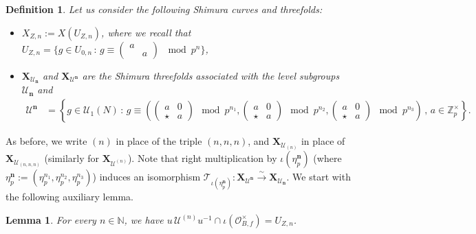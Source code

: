 \documentclass{amsart}
\numberwithin{equation}{section}
\newtheorem{lemma}[theorem]{Lemma}
\newtheorem{defn}[theorem]{Definition}
\newcommand{\NN}{\mathbb{N}}
\newcommand{\Zp}{\mathbb{Z}_p}
\newcommand{\cO}{\mathcal{O}}
\begin{document}
\begin{defn}
\label{defn_2024_03_12_1105}
Let us consider the following Shimura curves and threefolds:
\begin{itemize}
    \item $X_{Z,n} := X(U_{Z,n})$, where we recall that 
$U_{Z,n} = \{ g \in U_{0,n} \,:\, g \equiv \left ( \begin{smallmatrix} a &  \\  & a \end{smallmatrix} \right)\, \mod p^{n}  \}$,
\item $\mathbf{X}_{\mathcal{U}_\mathbf{n}}$ and $\mathbf{X}_{\mathcal{U}^{\mathbf{n}}}$ are the Shimura threefolds associated with the level subgroups $\mathcal{U}_{\mathbf{n}}$ and  \begin{align*}
  \mathcal{U}^{\mathbf{n}} &=\left \{ g \in  \mathcal{U}_{1}(N)\,:\, g \equiv \left(\left( \begin{smallmatrix}  a & 0\\ \star  & a \end{smallmatrix}\right) \mod p^{n_1},\left( \begin{smallmatrix}  a &0 \\ \star  & a \end{smallmatrix}\right) \mod p^{n_2},\left( \begin{smallmatrix} a & 0 \\ \star  & a \end{smallmatrix}\right) \mod p^{n_3}\right)\, ,\,a \in\Zp^\times\right\}.
     \end{align*}
\end{itemize}
\end{defn}
As before, we write $(n)$ in place of the triple $(n,n,n)$, and $\mathbf{X}_{\mathcal{U}_{(n)}}$ in place of $\mathbf{X}_{\mathcal{U}_{(n,n,n)}}$ (similarly for $\mathbf{X}_{\mathcal{U}^{(n)}}$).  Note that right multiplication by $\iota(\eta_p^{\mathbf{n}})$ (where $\eta_p^{\mathbf{n}}:=(\eta_p^{n_1},\eta_p^{n_2},\eta_p^{n_3})$) induces an isomorphism $\mathcal{T}_{\iota(\eta_p^{\mathbf{n}})}: \mathbf{X}_{\mathcal{U}^{\mathbf{n}}}  \xrightarrow{\sim} \mathbf{X}_{\mathcal{U}_\mathbf{n}}$. We start with the following auxiliary lemma. 



\begin{lemma}\label{lemma_pullback_opencompacts}
For every $n \in \NN$, we have $u\, \mathcal{U}^{(n)} u^{-1} \cap \iota(\cO_{B,f}^\times) = U_{Z,{n}}$. 
\end{lemma}
\end{document}
